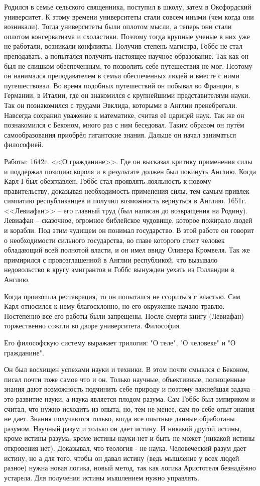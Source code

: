 Родился в семье сельского священника, поступил в школу, затем в Оксфордский университет. К этому времени университеты стали совсем иными (чем когда они возникали). Тогда университеты были оплотом мысли, а теперь они стали оплотом консерватизма и схоластики. Поэтому тогда крупные ученые в них уже не работали, возникали конфликты. Получив степень магистра, Гоббс не стал преподавать, а попытался получить настоящее научное образование. Так как он был не слишком обеспеченным, то позволить себе путешествия не мог. Поэтому он нанимался преподавателем в семьи обеспеченных людей и вместе с ними путешествовал. Во время подобных путешествий он побывал во Франции, в Германии, в Италии, где он знакомился с крупнейшими представителями науки. Так он познакомился с трудами Эвклида, которыми в Англии пренебрегали. Навсегда сохранил уважение к математике, считая её царицей наук. Так же он познакомился с Беконом, много раз с ним беседовал. Таким образом он путём самообразования приобрёл гигантские знания. Дальше он начал заниматься философией.

    Работы: 1642г. <<О гражданине>>. Где он высказал критику применения силы и поддержал позицию короля и в результате должен был покинуть Англию. Когда Карл I был обезглавлен, Гоббс стал проявлять лояльность к новому правительству, доказывая необходимость применения силы, тем самым привлек симпатию республиканцев и получил возможность вернуться в Англию. 1651г. <<Левиафан>> – его главный труд (был написан до возвращения на Родину). Левиафан – сказочное, огромное библейское чудовище, которое пожирало людей и корабли. Под этим чудищем он понимал государство. В этой работе он говорит о необходимости сильного государства, во главе которого стоит человек обладающий всей полнотой власти, и он имел ввиду Оливера Кромвеля. Так же примирился с провозглашенной в Англии республикой, что вызывало недовольство в кругу эмигрантов и Гоббс вынужден уехать из Голландии в Англию.

Когда произошла реставрация, то он попытался не ссориться с властью. Сам Карл относился к нему благосклонно, но его окружение начало травлю. Постепенно все его работы были запрещены. После смерти книгу (Левиафан) торжественно сожгли во дворе университета.
Философия

Его философскую систему выражает трилогия: "О теле", "О человеке" и "О гражданине".

    Он был восхищен успехами науки и техники. В этом почти смыклся с Беконом, писал почти тоже самое что и он. Только научные, объективные, полноценные знания дают возможность подчинить себе природу и поэтому важнейшая задача – это развитие науки, а наука является плодом разума. Сам Гоббс был эмпириком и считал, что нужно исходить из опыта, но, тем не менее, сам по себе опыт знания не дает. Знания получаются только, когда все опытные данные обработаны разумом. Научный разум и только он дает истину. И никакой другой истины, кроме истины разума, кроме истины науки нет и быть не может (никакой истины откровения нет). Доказывал, что теология - не наука. Человеческий разум дает истину, но а для того, чтобы он давал истину (ведь мышление у всех людей разное) нужна новая логика, новый метод, так как логика Аристотеля безнадёжно устарела. Для получения истины мышлением нужно управлять.

